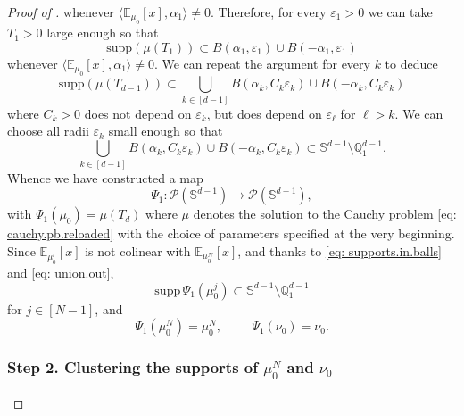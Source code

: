 \documentclass[a4paper,11pt]{article}
\theoremstyle{plain}
\newcommand{\supp}{\mathrm{supp}}
\renewcommand{\S}{\mathbb{S}^{d-1}}
\newcommand{\Q}{\mathbb{Q}}
\numberwithin{equation}{section}
\begin{document}
\begin{proof}[Proof of ]
whenever  $\langle \mathbb{E}_{\mu_0}[x], \alpha_1\rangle \neq 0$. 
Therefore, for every $\varepsilon_1>0$ we can take $T_1>0$ large enough so that
\begin{equation*}
    \supp(\mu(T_1))\subset B(\alpha_1,\varepsilon_1)\cup B(-\alpha_1,\varepsilon_1)
\end{equation*}
whenever $\langle \mathbb{E}_{\mu_0}[x],\alpha_1\rangle \neq 0$. We can repeat the argument for every $k$ to deduce
\begin{equation}\label{eq: supports.in.balls}
    \supp(\mu(T_{d-1}))\subset \bigcup_{k\in[d-1]} B(\alpha_k,C_{k}\varepsilon_k)\cup B(-\alpha_k,C_{k}\varepsilon_k)
\end{equation}
where $C_k>0$  does not depend on $\varepsilon_k$, but does depend on  $\varepsilon_\ell$ for $\ell>k$. 
We can choose all radii $\varepsilon_k$ small enough so that
    \begin{equation}\label{eq: union.out}
        \bigcup_{k\in[d-1]} B(\alpha_k,C_{k}\varepsilon_k)\cup B(-\alpha_k,C_{k}\varepsilon_k)\subset\S\setminus\Q_1^{d-1}.
    \end{equation}
Whence we have constructed a map 
$$\Psi_{1}:\mathscr{P}(\S)\to\mathscr{P}(\S),$$
with $\Psi_1(\mu_0)=\mu(T_d)$ where $\mu$ denotes the solution to the Cauchy problem \eqref{eq: cauchy.pb.reloaded} with the choice of parameters specified at the very beginning.  Since $\mathbb{E}_{\mu_0^i}[x]$ is not colinear with $\mathbb{E}_{\mu_0^N}[x]$, and thanks to \eqref{eq: supports.in.balls} and \eqref{eq: union.out},
$$\supp\,\Psi_1(\mu^j_0)\subset\S\setminus\Q_1^{d-1}$$ for $j\in[N-1]$, and 
$$\Psi_1(\mu^N_0)=\mu^N_0,\hspace{1cm} \Psi_1(\nu_0)=\nu_0.$$

\subsubsection*{Step 2. Clustering the supports of $\mu_0^N$ and $\nu_0$}


\end{proof}
\end{document}
